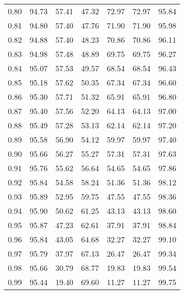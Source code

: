 \begin{tabular}{|c|c|c|c|c|c|c|}
      0.80 &     94.73 &     57.41 &      47.32 &   72.97 &      72.97 &         95.84 \\
      0.81 &     94.80 &     57.40 &      47.76 &   71.90 &      71.90 &         95.98 \\
      0.82 &     94.88 &     57.40 &      48.23 &   70.86 &      70.86 &         96.11 \\
      0.83 &     94.98 &     57.48 &      48.89 &   69.75 &      69.75 &         96.27 \\
      0.84 &     95.07 &     57.53 &      49.57 &   68.54 &      68.54 &         96.43 \\
      0.85 &     95.18 &     57.62 &      50.35 &   67.34 &      67.34 &         96.60 \\
      0.86 &     95.30 &     57.71 &      51.32 &   65.91 &      65.91 &         96.80 \\
      0.87 &     95.40 &     57.56 &      52.20 &   64.13 &      64.13 &         97.00 \\
      0.88 &     95.49 &     57.28 &      53.13 &   62.14 &      62.14 &         97.20 \\
      0.89 &     95.58 &     56.90 &      54.12 &   59.97 &      59.97 &         97.40 \\
      0.90 &     95.66 &     56.27 &      55.27 &   57.31 &      57.31 &         97.63 \\
      0.91 &     95.76 &     55.62 &      56.64 &   54.65 &      54.65 &         97.86 \\
      0.92 &     95.84 &     54.58 &      58.24 &   51.36 &      51.36 &         98.12 \\
      0.93 &     95.89 &     52.95 &      59.75 &   47.55 &      47.55 &         98.36 \\
      0.94 &     95.90 &     50.62 &      61.25 &   43.13 &      43.13 &         98.60 \\
      0.95 &     95.87 &     47.23 &      62.61 &   37.91 &      37.91 &         98.84 \\
      0.96 &     95.84 &     43.05 &      64.68 &   32.27 &      32.27 &         99.10 \\
      0.97 &     95.79 &     37.97 &      67.13 &   26.47 &      26.47 &         99.34 \\
      0.98 &     95.66 &     30.79 &      68.77 &   19.83 &      19.83 &         99.54 \\
      0.99 &     95.44 &     19.40 &      69.60 &   11.27 &      11.27 &         99.75 \\
\bottomrule
\end{tabular}
